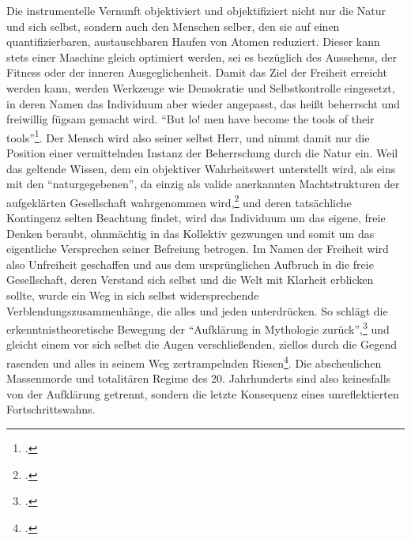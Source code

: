 \documentclass[a4paper, 12pt]{article}
\begin{document}
\begin{onehalfspace}
Die instrumentelle Vernunft objektiviert und objektifiziert nicht nur die Natur und sich selbst, sondern auch den Menschen selber, den sie auf einen quantifizierbaren, austauschbaren Haufen von Atomen reduziert. Dieser kann stets einer Maschine gleich optimiert werden, sei es bezüglich des Aussehens, der Fitness oder der inneren Ausgeglichenheit. Damit das Ziel der Freiheit erreicht werden kann, werden Werkzeuge wie Demokratie und Selbstkontrolle eingesetzt, in deren Namen das Individuum aber wieder angepasst, das heißt beherrscht und freiwillig fügsam gemacht wird. "`But lo! men have become the tools of their tools"'\footnote{\Cite[Siehe][S. 37]{walden}.}. Der Mensch wird also seiner selbst Herr, und nimmt damit nur die Position einer vermittelnden Instanz der Beherrschung durch die Natur ein. Weil das geltende Wissen, dem ein objektiver Wahrheitswert unterstellt wird, als eins mit den "`naturgegebenen"', da einzig als valide anerkannten Machtstrukturen der aufgeklärten Gesellschaft wahrgenommen wird,\footnote{\Cite[Vgl.][S. 411]{habermas}.} und deren tatsächliche Kontingenz selten Beachtung findet, wird das Individuum um das eigene, freie Denken beraubt, ohnmächtig in das Kollektiv gezwungen und somit um das eigentliche Versprechen seiner Befreiung betrogen. Im Namen der Freiheit wird also Unfreiheit geschaffen und aus dem ursprünglichen Aufbruch in die freie Gesellschaft, deren Verstand sich selbst und die Welt mit Klarheit erblicken sollte, wurde ein Weg in sich selbst widersprechende Verblendungszusammenhänge, die alles und jeden unterdrücken. So schlägt die erkenntnistheoretische Bewegung der "`Aufklärung in Mythologie zurück"',\footnote{\Cite[Siehe][S. 6]{dialektik-der-aufklaerung}.} und gleicht einem vor sich selbst die Augen verschließenden, ziellos durch die Gegend rasenden und alles in seinem Weg zertrampelnden Riesen\footnote{\Cite[Vgl.][S. 25]{fortschritt}.}. Die abscheulichen Massenmorde und totalitären Regime des 20. Jahrhunderts sind also keinesfalls von der Aufklärung getrennt, sondern die letzte Konsequenz eines unreflektierten Fortschrittswahns.


\end{onehalfspace}
\end{document}
